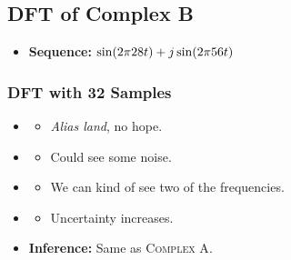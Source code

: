 \documentclass[../../course]{subfiles}
\begin{document}
\pagebreak

\subsection{DFT of Complex B} \label{ssec:dtftCplxB}

\begin{itemize} [label=]

    \item \textbf{Sequence:} $\sin(2 \pi 28 t) + j \sin(2 \pi 56 t)$

\end{itemize}

\subsubsection{DFT with 32 Samples}

\begin{itemize} [label=]

    \item \sampFreqMuchLess
        \begin{itemize} [label=]
            \item \emph{Alias land}, no hope.
        \end{itemize}

    \item \sampFreqNorm
        \begin{itemize} [label=]
            \item Could see some noise.
        \end{itemize}

    \item \sampFreqSligGreat
        \begin{itemize} [label=]
            \item We can kind of see two of the frequencies.
        \end{itemize}

    \item \sampFreqMuchGreat
        \begin{itemize} [label=]
            \item Uncertainty increases.
        \end{itemize}

    \item \textbf{Inference:} Same as \textsc{Complex A}.

\end{itemize}

\vfill
\end{document}
